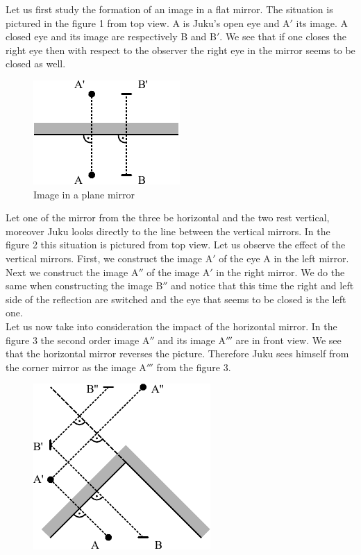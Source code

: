 {\ifEngSolution
Let us first study the formation of an image in a flat mirror. The situation is pictured in the figure 1 from top view. A is Juku’s open eye and A$'$ its image. A closed eye and its image are respectively B and B$'$. We see that if one closes the right eye then with respect to the observer the right eye in the mirror seems to be closed as well. 
\begin{figure}[h]
	\centerline{\includegraphics[scale=1.2]{2016-v3g-08-nurgapeegel_j1}}
	\caption{Image in a plane mirror}
\end{figure}
Let one of the mirror from the three be horizontal and the two rest vertical, moreover Juku looks directly to the line between the vertical mirrors. In the figure 2 this situation is pictured from top view. Let us observe the effect of the vertical mirrors. First, we construct the image A$'$ of the eye A in the left mirror. Next we construct the image A$''$ of the image A$'$ in the right mirror. We do the same when constructing the image B$''$ and notice that this time the right and left side of the reflection are switched and the eye that seems to be closed is the left one.\\
Let us now take into consideration the impact of the horizontal mirror. In the figure 3 the second order image A$''$ and its image A$'''$ are in front view. We see that the horizontal mirror reverses the picture. Therefore Juku sees himself from the corner mirror as the image A$'''$ from the figure 3. 
\begin{figure}[h]
	\centerline{\includegraphics[scale=1.2]{2016-v3g-08-nurgapeegel_j2}}

\end{figure}}
